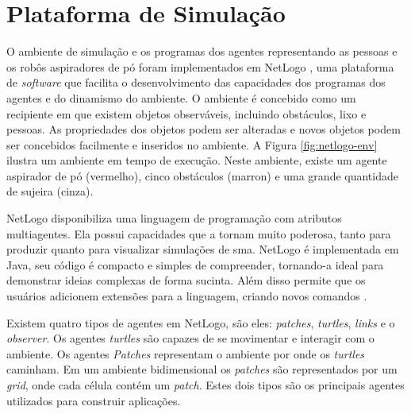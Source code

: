 \section{Plataforma de Simulação}
\label{sec:plat-sim}

O ambiente de simulação e os programas dos agentes representando as pessoas e os robôs aspiradores de pó foram implementados em NetLogo \cite{wilensky1999netlogo}, uma plataforma de \textit{software} que facilita o desenvolvimento das capacidades dos programas dos agentes e do dinamismo do ambiente. O ambiente é concebido como um recipiente em que existem objetos observáveis, incluindo obstáculos, lixo e pessoas. As propriedades dos objetos podem ser alteradas e novos objetos podem ser concebidos facilmente e inseridos no ambiente. A Figura \ref{fig:netlogo-env} ilustra um ambiente em tempo de execução. Neste ambiente, existe um agente aspirador de pó (vermelho), cinco obstáculos (marron) e uma grande quantidade de sujeira (cinza).


\begin{figure}[h!]
    \centering
\end{figure}

NetLogo disponibiliza uma linguagem de programação com atributos multiagentes. Ela possui capacidades que a tornam muito poderosa, tanto para produzir quanto para visualizar simulações de \acrlong{sma}. NetLogo é implementada em Java, seu código é compacto e simples de compreender, tornando-a ideal para demonstrar ideias complexas de forma sucinta. Além disso permite que os usuários adicionem extensões para a linguagem, criando novos comandos \cite{teahan2010artificial}.

Existem quatro tipos de agentes em NetLogo, são eles: \textit{patches}, \textit{turtles}, \textit{links} e o \textit{observer}. Os agentes \textit{turtles} são capazes de se movimentar e interagir com o ambiente. Os agentes \textit{Patches} representam o ambiente por onde os \textit{turtles} caminham. Em um ambiente bidimensional os \textit{patches} são representados por um \textit{grid}, onde cada célula contém um \textit{patch}. Estes dois tipos são os principais agentes utilizados para construir aplicações. 

